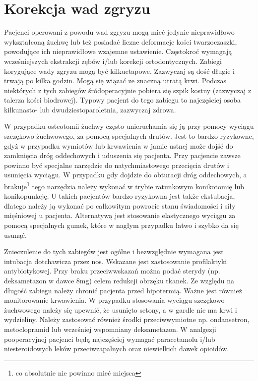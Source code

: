 \documentclass[a4paper, 12pt]{report}
\begin{document}
\section{Korekcja wad zgryzu}

Pacjenci operowani z powodu wad zgryzu mogą mieć jedynie nieprawidłowo
wykształconą żuchwę lub też posiadać liczne deformacje kości
twarzoczaszki, powodujące ich nieprawidłowe wzajemne
ustawienie. Częstokroć wymagają wcześniejszych ekstrakcji zębów i/lub
korekcji ortodontycznych. Zabiegi korygujące wady zgryzu mogą być
kilkuetapowe. Zazwyczaj są dość długie i trwają po kilka godzin. Mogą
się wiązać ze znaczną utratą krwi. Podczas niektórych z tych zabiegów
śródoperacyjnie pobiera się szpik kostny (zazwyczaj z talerza kości
biodrowej). Typowy pacjent do tego zabiegu to najczęściej osoba
kilkunasto- lub dwudziestoparoletnia, zazwyczaj zdrowa.

W przypadku osteotomii żuchwy często unieruchamia się ją przy pomocy
wyciągu szczękowo-żuchwowego, za pomocą specjalnych drutów. Jest to
bardzo ryzykowne, gdyż w przypadku wymiotów lub krwawienia w jamie
ustnej może dojść do zamknięcia dróg oddechowych i uduszenia się
pacjenta. Przy pacjencie zawsze powinno być specjalne narzędzie do
natychmiastowego przecięcia drutów i usunięcia wyciągu. W przypadku
gdy dojdzie do obturacji dróg oddechowych, a brakuje\footnote{co
  absolutnie nie powinno mieć miejsca} tego narzędzia należy wykonać w
trybie ratunkowym konikotomię lub konikopunkcję. U takich pacjentów
bardzo ryzykowna jest także ekstubacja, dlatego należy ją wykonać po
całkowitym powrocie stanu świadomości i siły mięśniowej u pacjenta.
Alternatywą jest stosowanie elastycznego wyciągu za pomocą specjalnych
gumek, które w nagłym przypadku łatwo i szybko da się usunąć.

Znieczulenie do tych zabiegów jest ogólne i bezwzględnie wymagana jest
intubacja dotchawicza przez nos. Wskazane jest zastosowanie
profilaktyki antybiotykowej. Przy braku przeciwwskazań można podać
sterydy (np. deksametazon w dawce 8mg) celem redukcji obrzęku tkanek.
Ze względu na długość zabiegu należy chronić pacjenta przed
hipotermią. Ważne jest również monitorowanie krwawienia. W przypadku
stosowania wyciągu szczękowo-żuchwowego należy się upewnić, że
usunięto setony, a w gardle nie ma krwi i wydzieliny. Należy
zastosować również środki przeciwwymiotne np. ondansetron,
metoclopramid lub wcześniej wspomniany deksametazon. W analgezji
pooperacyjnej pacjenci będą najczęściej wymagać paracetamolu i/lub
niesteroidowych leków przeciwzapalnych oraz niewielkich dawek
opioidów.
\end{document}
